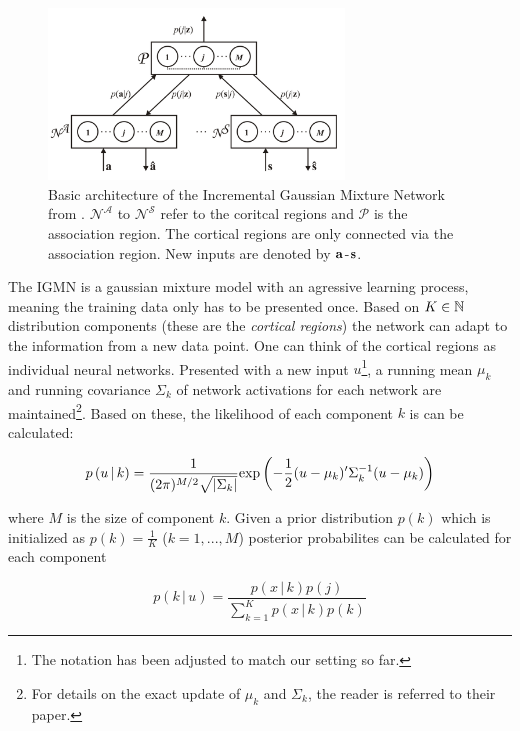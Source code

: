 \begin{figure}
    \begin{center}
    \includegraphics[width=0.7\textwidth]{Pictures/IGMN_Structure.png}
    \end{center}
    \label{FIG:IGMN}
    \caption{Basic architecture of the Incremental Gaussian Mixture Network from \cite{Heinen2011IGMN}. $\mathcal{N}^{\mathcal{A}}$ to $\mathcal{N}^{\mathcal{S}}$ refer to the coritcal regions and $\mathcal{P}$ is the association region. The cortical regions are only connected via the association region. New inputs are denoted by ${\bf a}$-${\bf s}$.}
\end{figure}

The IGMN is a gaussian mixture model with an agressive learning process, meaning the training data only has to be presented once. Based on $K \in \mathbb{N}$ distribution components (these are the \textit{cortical regions}) the network can adapt to the information from a new data point. One can think of the cortical regions as individual neural networks. Presented with a new input $u$\footnote{The notation has been adjusted to match our setting so far.}, a running mean $\mu_k$ and running covariance $\Sigma_k$ of network activations for each network are maintained\footnote{For details on the exact update of $\mu_k$ and $\Sigma_k$, the reader is referred to their paper.}. Based on these, the likelihood of each component $k$ is can be calculated:

\begin{equation}
    p \left(u \, | \, k\right)= \frac{1}{(2\pi)^{M/2}\sqrt{\left| \Sigma_k \right|}} \text{exp}\left( -\frac{1}{2}(u - \mu_k)'\Sigma_k^{-1}(u-\mu_k) \right)
\end{equation}

where $M$ is the size of component $k$. Given a prior distribution $p(k)$ which is initialized as $p(k) = \frac{1}{K}$ ($k = 1, ..., M$) posterior probabilites can be calculated for each component

\begin{equation}
    p(k \, | \, u) = \frac{p \left(x \, | \, k\right) p(j)}{\sum_{k=1}^{K} p \left(x \, | \, k\right) p(k)} \label{EQ:ESIGMN:posterior}
\end{equation}

